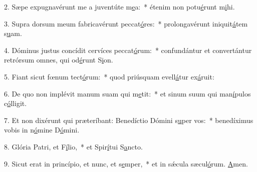 2. Sæpe expugnavérunt me a juventúte m\uline{e}a:~* étenim non potu\uline{é}runt m\uline{i}hi.\par 
3. Supra dorsum meum fabricavérunt peccat\uline{ó}res:~* prolongavérunt iniquit\uline{á}tem s\uline{u}am.\par 
4. Dóminus justus concídit cervíces peccat\uline{ó}rum:~* confundántur et convertántur retrórsum omnes, qui od\uline{é}runt S\uline{i}on.\par 
5. Fiant sicut fœnum tect\uline{ó}rum:~* quod priúsquam evell\uline{á}tur ex\uline{á}ruit:\par 
6. De quo non implévit manum suam qui m\uline{e}tit:~* et sinum suum qui man\uline{í}pulos c\uline{ó}lligit.\par 
7. Et non dixérunt qui præteríbant: Benedíctio Dómini s\uline{u}per vos:~* benedíximus vobis in n\uline{ó}mine D\uline{ó}mini.\par 
8. Glória Patri, et F\uline{í}lio,~* et Spir\uline{í}tui S\uline{a}ncto.\par 
9. Sicut erat in princípio, et nunc, et s\uline{e}mper,~* et in sǽcula sæcul\uline{ó}rum. \uline{A}men.\par 
